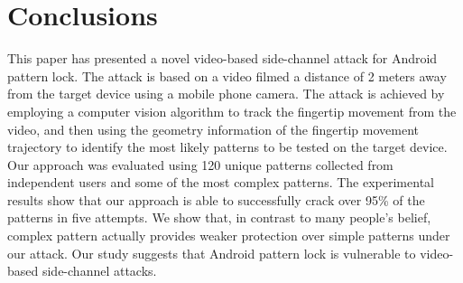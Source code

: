 \section{Conclusions}
This paper has presented a novel video-based side-channel attack for
Android pattern lock. The attack is based on a video filmed a distance of 2 meters away from the target device using a mobile phone camera. The attack is
achieved by employing a computer vision algorithm to track the
fingertip movement from the video, and then using the geometry information
of the fingertip movement trajectory to identify the most likely patterns to be
tested on the target device.  Our approach was evaluated using 120 unique patterns collected
from independent users and some of the most complex patterns. The experimental results show that our approach
is able to successfully crack over 95\% of the patterns in five attempts.
We show that, in contrast to many people's belief, complex pattern actually provides
weaker protection over simple patterns under our attack. Our study
suggests that Android pattern lock is vulnerable to video-based
side-channel attacks.

